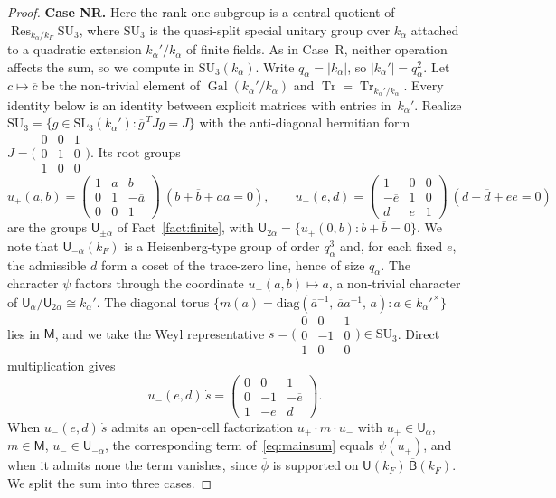 \documentclass[11pt]{amsart}
\theoremstyle{definition}
\theoremstyle{remark}
\DeclareMathOperator{\Tr}{Tr}
\DeclareMathOperator{\Res}{Res}
\DeclareMathOperator{\Gal}{Gal}
\newcommand{\barr}[1]{\overline{#1}}
\begin{document}
\begin{proof}
\smallskip
\noindent\textbf{Case NR.} Here the rank-one subgroup is a central quotient of $\Res_{k_\alpha/k_F}\mathrm{SU}_3$, where $\mathrm{SU}_3$ is the quasi-split special unitary group over $k_\alpha$ attached to a quadratic extension $k_\alpha'/k_\alpha$ of finite fields. As in Case~R, neither operation affects the sum, so we compute in $\mathrm{SU}_3(k_\alpha)$. Write $q_\alpha = |k_\alpha|$, so $|k_\alpha'| = q_\alpha^2$. Let $c\mapsto\barr{c}$ be the non-trivial element of $\Gal(k_\alpha'/k_\alpha)$ and $\Tr = \Tr_{k_\alpha'/k_\alpha}$. Every identity below is an identity between explicit matrices with entries in~$k_\alpha'$. Realize $\mathrm{SU}_3 = \{g\in\mathrm{SL}_3(k_\alpha') : \barr{g}^{\,T}Jg = J\}$ with the anti-diagonal hermitian form $J = \bigl(\begin{smallmatrix}0&0&1\\0&1&0\\1&0&0\end{smallmatrix}\bigr)$. Its root groups
\[
u_+(a,b) = \begin{pmatrix}1&a&b\\0&1&-\barr a\\0&0&1\end{pmatrix}
\ (b+\barr b+a\barr a = 0), \qquad
u_-(e,d) = \begin{pmatrix}1&0&0\\-\barr e&1&0\\d&e&1\end{pmatrix}
\ (d+\barr d+e\barr e = 0)
\]
are the groups $\mathsf{U}_{\pm\alpha}$ of Fact~\ref{fact:finite}, with $\mathsf{U}_{2\alpha} = \{u_+(0,b): b+\barr b = 0\}$. We note that $\mathsf{U}_{-\alpha}(k_F)$ is a Heisenberg-type group of order $q_\alpha^3$ and, for each fixed $e$, the admissible $d$ form a coset of the trace-zero line, hence of size $q_\alpha$. The character $\psi$ factors through the coordinate $u_+(a,b)\mapsto a$, a non-trivial character of $\mathsf{U}_\alpha/\mathsf{U}_{2\alpha}\cong k_\alpha'$. The diagonal torus $\{m(a) = \mathrm{diag}(\barr a^{-1},\,\barr a a^{-1},\,a) : a\in k_\alpha'^\times\}$ lies in $\mathsf{M}$, and we take the Weyl representative $\dot{s} = \bigl(\begin{smallmatrix}0&0&1\\0&-1&0\\1&0&0\end{smallmatrix}\bigr) \in\mathrm{SU}_3$. Direct multiplication gives
\[
u_-(e,d)\,\dot{s} =
\begin{pmatrix}0&0&1\\0&-1&-\barr e\\1&-e&d\end{pmatrix}.
\]
When $u_-(e,d)\,\dot{s}$ admits an open-cell factorization $u_+\cdot m\cdot u_-$ with $u_+\in\mathsf{U}_\alpha$, $m\in\mathsf{M}$, $u_-\in\mathsf{U}_{-\alpha}$, the corresponding term of~\eqref{eq:mainsum} equals $\psi(u_+)$, and when it admits none the term vanishes, since $\barr{\phi}$ is supported on $\mathsf{U}(k_F)\,\barr{\mathsf{B}}(k_F)$. We split the sum into three cases.


\end{proof}
\end{document}
